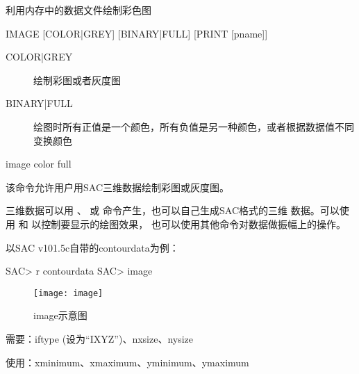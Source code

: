 \label{cmd:image}

利用内存中的数据文件绘制彩色图

\begin{SACSTX}
IMAGE [COLOR|GREY] [BINARY|FULL] [PRINT [pname]]
\end{SACSTX}

\begin{description}
\item [COLOR|GREY] 绘制彩图或者灰度图
\item [BINARY|FULL] 绘图时所有正值是一个颜色，所有负值是另一种颜色，或者根据数据值不同变换颜色
\end{description}

\begin{SACDFT}
image color full
\end{SACDFT}

该命令允许用户用SAC三维数据绘制彩图或灰度图。

三维数据可以用 、
 或  命令产生，也可以自己生成SAC格式的三维
数据。可以使用  和  以控制要显示的绘图效果，
也可以使用其他命令对数据做振幅上的操作。

以SAC v101.5c自带的contourdata为例：
\begin{SACCode}
SAC> r contourdata
SAC> image
\end{SACCode}

\begin{figure}[!ht]
\centering
\texttt{[image: image]}
\caption{image示意图}
\end{figure}

需要：iftype (设为``IXYZ'')、nxsize、nysize

使用：xminimum、xmaximum、yminimum、ymaximum
